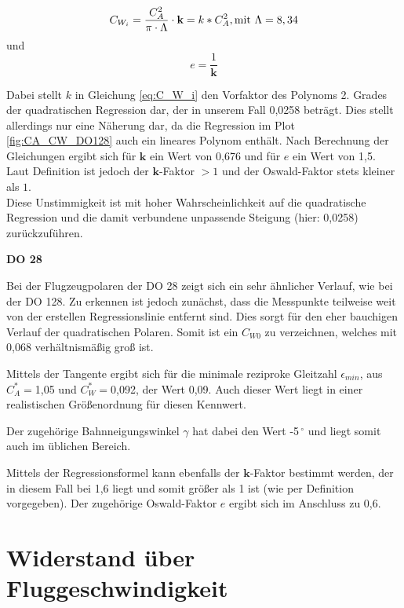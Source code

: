\begin{equation}
C_{W_{i}}=\frac{C_A^2}{\pi \cdot \Lambda}\cdot \textbf{k}=k*C_A^2, \\ \mathrm{mit} \ \Lambda=8,34 
\label{eq:C_W_i}
\end{equation}
und
\begin{equation}
e=\frac{1}{\textbf{k}}
\end{equation}

Dabei stellt $k$ in Gleichung \ref{eq:C_W_i} den Vorfaktor des Polynoms 2. Grades der quadratischen Regression dar, der in unserem Fall 0,0258 beträgt. Dies stellt allerdings nur eine Näherung dar, da die Regression im Plot \ref{fig:CA_CW_DO128} auch ein lineares Polynom enthält. Nach Berechnung der Gleichungen ergibt sich für $\textbf{k}$ ein Wert von 0,676 und für $e$ ein Wert von 1,5. 
Laut Definition ist jedoch der $\textbf{k}$-Faktor $>1$ und der Oswald-Faktor stets kleiner als $1$. \\
Diese Unstimmigkeit ist mit hoher Wahrscheinlichkeit auf die quadratische Regression und die damit verbundene unpassende Steigung (hier: 0,0258) zurückzuführen.

\textbf{DO 28}

Bei der Flugzeugpolaren der DO 28 zeigt sich ein sehr ähnlicher Verlauf, wie bei der DO 128. Zu erkennen ist jedoch zunächst, dass die Messpunkte teilweise weit von der erstellen Regressionslinie entfernt sind. Dies sorgt für den eher bauchigen Verlauf der quadratischen Polaren. Somit ist ein $C_{W0}$ zu verzeichnen, welches mit 0,068 verhältnismäßig groß ist. 

Mittels der Tangente ergibt sich für die minimale reziproke Gleitzahl $\epsilon_{min}$, aus $C_A^*=$1,05 und $C_W^*=$0,092, der Wert 0,09. Auch dieser Wert liegt in einer realistischen Größenordnung für diesen Kennwert.

Der zugehörige Bahnneigungswinkel $\gamma$ hat dabei den Wert -5$^{\ \circ}$ und liegt somit auch im üblichen Bereich. 

Mittels der Regressionsformel kann ebenfalls der $\textbf{k}$-Faktor bestimmt werden, der in diesem Fall bei 1,6 liegt und somit größer als 1 ist (wie per Definition vorgegeben). Der zugehörige Oswald-Faktor $e$ ergibt sich im Anschluss zu 0,6. 

\section{Widerstand über Fluggeschwindigkeit}

